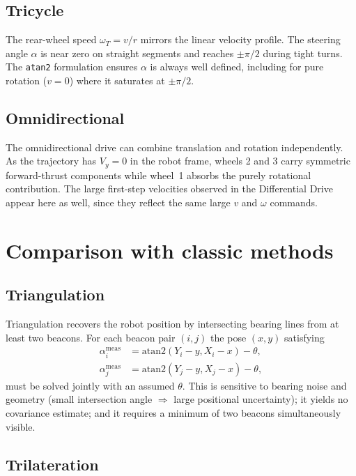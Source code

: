 \documentclass[a4paper,11pt]{report}
\begin{document}
\subsection{Tricycle}

The rear-wheel speed $\omega_T = v/r$ mirrors the linear velocity profile.  The steering angle $\alpha$ is near zero on straight segments and reaches $\pm\pi/2$ during tight turns.  The \texttt{atan2} formulation ensures $\alpha$ is always well defined, including for pure rotation ($v = 0$) where it saturates at $\pm\pi/2$.

\subsection{Omnidirectional}

The omnidirectional drive can combine translation and rotation independently.  As the trajectory has $V_y = 0$ in the robot frame, wheels 2 and 3 carry symmetric forward-thrust components while wheel~1 absorbs the purely rotational contribution.  The large first-step velocities observed in the Differential Drive appear here as well, since they reflect the same large $v$ and $\omega$ commands.

\section{Comparison with classic methods}

\subsection{Triangulation}

Triangulation recovers the robot position by intersecting bearing lines from at least two beacons.  For each beacon pair $(i, j)$ the pose $(x, y)$ satisfying
\begin{align}
  \alpha_i^{\mathrm{meas}} &= \mathrm{atan2}(Y_i - y, X_i - x) - \theta, \\
  \alpha_j^{\mathrm{meas}} &= \mathrm{atan2}(Y_j - y, X_j - x) - \theta,
\end{align}
must be solved jointly with an assumed $\theta$.  This is sensitive to bearing noise and geometry (small intersection angle $\Rightarrow$ large positional uncertainty); it yields no covariance estimate; and it requires a minimum of two beacons simultaneously visible.

\subsection{Trilateration}
\end{document}
